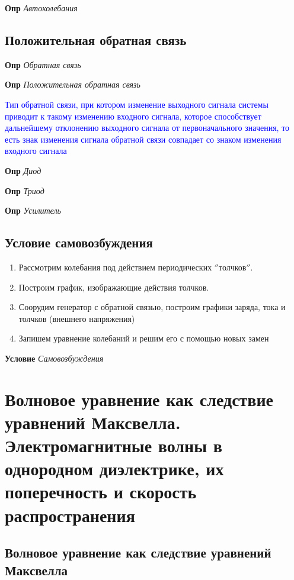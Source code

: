 \documentclass[a4paper, 14pt]{article}
\begin{document}
    \textbf{Опр} \textit{Автоколебания}
    
    \subsection{Положительная обратная связь}
    
    \textbf{Опр} \textit{Обратная связь}
    
    \textbf{Опр} \textit{Положительная обратная связь}
    
    \textcolor{blue}{Тип обратной связи, при котором изменение выходного сигнала системы приводит к такому изменению
    входного сигнала, которое способствует дальнейшему отклонению выходного сигнала от первоначального значения, то
    есть знак изменения сигнала обратной связи совпадает со знаком изменения входного сигнала}
    
    \textbf{Опр} \textit{Диод}
    
    \textbf{Опр} \textit{Триод}
    
    \textbf{Опр} \textit{Усилитель}
    
    \subsection{Условие самовозбуждения}
    
    \begin{enumerate}
        \item Рассмотрим колебания под действием периодических \(''\)толчков\(''\).
        \item Построим график, изображающие действия толчков.
        \item Соорудим генератор с обратной связью, построим графики заряда, тока и толчков (внешнего напряжения)
        \item Запишем уравнение колебаний и решим его с помощью новых замен
    \end{enumerate}
    
    \textbf{Условие} \textit{Самовозбуждения}
    
    \section{Волновое уравнение как следствие уравнений Максвелла.
    Электромагнитные волны в однородном диэлектрике, их поперечность и скорость распространения}
    
    \subsection{Волновое уравнение как следствие уравнений Максвелла}
    
\end{document}
